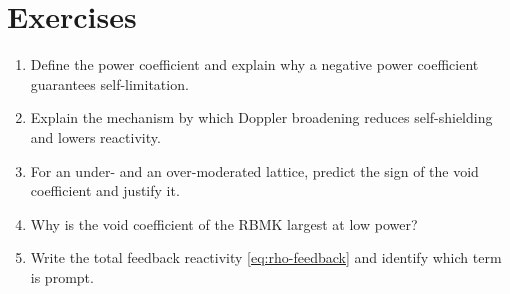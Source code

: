 \section*{Exercises}
\begin{enumerate}[leftmargin=*,itemsep=2pt]
\item Define the power coefficient and explain why a negative power coefficient guarantees self-limitation.
\item Explain the mechanism by which Doppler broadening reduces self-shielding and lowers reactivity.
\item For an under- and an over-moderated lattice, predict the sign of the void coefficient and justify it.
\item Why is the void coefficient of the RBMK largest at low power?
\item Write the total feedback reactivity \eqref{eq:rho-feedback} and identify which term is prompt.
\end{enumerate}
